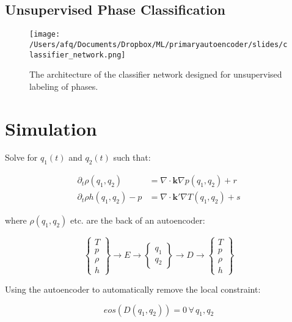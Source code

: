 \documentclass[]{article}
\begin{document}
\hypertarget{header-n3317}{%
\subsection{Unsupervised Phase Classification}\label{header-n3317}}

\begin{figure}
\centering
\texttt{[image: /Users/afq/Documents/Dropbox/ML/primaryautoencoder/slides/classifier\_network.png]}
\caption{The architecture of the classifier network designed for
  unsupervised labeling of phases.}
\end{figure}

\hypertarget{header-n3321}{%
\section{Simulation}\label{header-n3321}}

Solve for \(q_1(t)\) and \(q_2(t)\) such that:

\begin{align}
\partial_t \rho(q_1,q_2) & = \nabla \cdot \mathbf{k} \nabla p(q_1,q_2) + r \\
\partial_t \rho h(q_1,q_2)-p & = \nabla \cdot \mathbf{k'}\nabla T(q_1,q_2) + s
\end{align}

where \(\rho(q_1,q_2)\) etc. are the back of an autoencoder:

\begin{equation}
\left\{ \begin{array}{c}
T\\ p\\ \rho\\ h
\end{array}\right\} \rightarrow  E \rightarrow 
\left\{ \begin{array}{c} q_1\\q_2 \end{array} \right\}\rightarrow D \rightarrow 
\left\{ \begin{array}{c}
T\\ p\\ \rho\\ h
\end{array}\right\}
\end{equation}

Using the autoencoder to automatically remove the local constraint:

\begin{equation}
eos(D(q_1,q_2)) = 0 \, \forall \,q_1,q_2
\end{equation}
\end{document}
